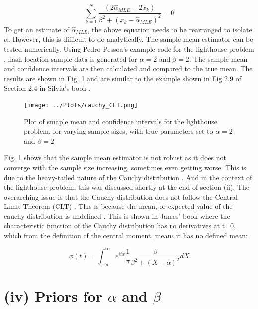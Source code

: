 \documentclass[12pt]{report} %
\begin{document}
\begin{equation}
    \sum_{k=1}^{N} \frac{(2\hat{\alpha}_{MLE} - 2x_{k})}{\beta^{2} + (x_{k} - \hat{\alpha}_{MLE})^{2}} = 0
\end{equation}
\newline
To get an estimate of $\hat{\alpha}_{MLE}$, the above equation needs to be rearranged to isolate $\alpha$. However, this is difficult to do analytically. The sample mean estimator can be tested numerically. Using Pedro Pessoa's example code for the lighthouse problem \cite{pessoa_lighthouse}, flash location sample data is generated for $\alpha = 2$ and $\beta = 2$. The sample mean and confidence intervals are then calculated and compared to the true mean. The results are shown in Fig. \ref{fig:sample_mean} and are similar to the example shown in Fig 2.9 of Section 2.4 in Silvia's book \cite{sivia_data_analysis}.

\begin{figure}[h]
\centering
\texttt{[image: ../Plots/cauchy\_CLT.png]}
\caption{Plot of smaple mean and confidence intervals for the lighthouse problem, for varying sample sizes, with true parameters set to $\alpha = 2$ and $\beta = 2$}
\label{fig:sample_mean}
\end{figure}

Fig. \ref{fig:sample_mean} shows that the sample mean estimator is not robust as it does not converge with the sample size increasing, sometimes even getting worse. This is due to the heavy-tailed nature of the Cauchy distribution  \cite[p34]{sivia_data_analysis} \cite[p84]{FJames2006}. And in the context of the lighthouse problem, this was discussed shortly at the end of section (ii). The overarching issue is that the Cauchy distribution does not follow the Central Limit Theorem (CLT) \cite[p34]{sivia_data_analysis}. This is because the mean, or expected value of the cauchy distribution is undefined \cite[p84]{FJames2006}. This is shown in James' book \cite[p34]{FJames2006} where the characteristic function of the Cauchy distribution has no derivatives at t=0, which from the definition of the central moment, means it has no defined mean:

\begin{equation}
    \phi(t) = \int_{-\infty}^{\infty} e^{itx} \frac{1}{\pi} \frac{\beta}{\beta^{2} + (X - \alpha)^{2}} dX
\end{equation}


\chapter{(iv) Priors for $\alpha$ and $\beta$}
\end{document}
